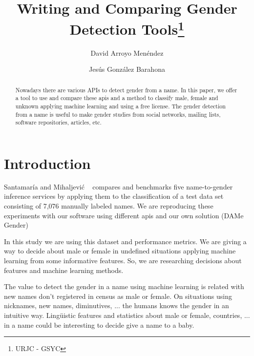 \documentclass[runningheads]{llncs}
\begin{document}
%
\title{Writing and Comparing Gender Detection Tools\thanks{URJC - GSYC}}
%
%
\author{David Arroyo Menéndez \and
Jesús González Barahona}
%
%
%
\maketitle              %
%
\begin{abstract}
Nowadays there are various APIs to detect gender from a name. In this
paper, we offer a tool to use and compare these apis and a method to
classify male, female and unknown applying machine learning and using
a free license. The gender detection from a name is useful to make
gender studies from social networks, mailing lists, software
repositories, articles, etc.

\end{abstract}
%
%
%
\section{Introduction}
Santamaría and Mihaljević ~\cite{10.7717/peerj-cs.156} compares
and benchmarks five name-to-gender inference services by applying them
to the classification of a test data set consisting of 7,076 manually
labeled names. We are reproducing these experiments with our software
using different apis and our own solution (DAMe Gender)

In this study we are using this dataset and performance metrics. We
are giving a way to decide about male or female in undefined
situations applying machine learning from some informative
features. So, we are researching decisions about features and machine
learning methods.

The value to detect the gender in a name using machine learning is
related with new names don't registered in census as male or female.
On situations using nicknames, new names, diminutives, ... the humans
knows the gender in an intuitive way. Lingüistic features and
statistics about male or female, countries, ... in a name could be
interesting to decide give a name to a baby.
\end{document}
